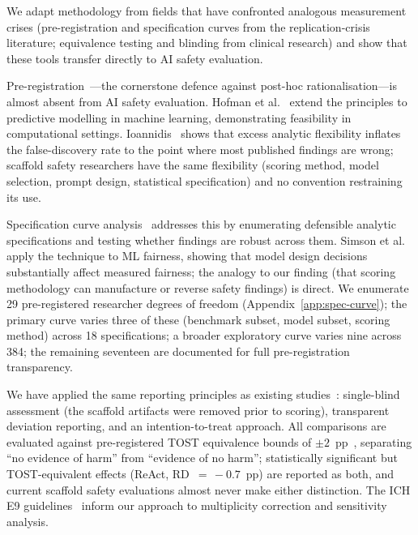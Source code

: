 We adapt methodology from fields that have confronted analogous measurement crises (pre-registration and specification curves from the replication-crisis literature; equivalence testing and blinding from clinical research) and show that these tools transfer directly to AI safety evaluation.

Pre-registration~\cite{nosek2018preregistration}---the cornerstone defence against post-hoc rationalisation---is almost absent from AI safety evaluation. Hofman et al.~\cite{hofman2023preregistration} extend the principles to predictive modelling in machine learning, demonstrating feasibility in computational settings. Ioannidis~\cite{ioannidis2005false} shows that excess analytic flexibility inflates the false-discovery rate to the point where most published findings are wrong; scaffold safety researchers have the same flexibility (scoring method, model selection, prompt design, statistical specification) and no convention restraining its use.

Specification curve analysis~\cite{simonsohn2020specification} addresses this by enumerating defensible analytic specifications and testing whether findings are robust across them. Simson et al.~\cite{simson2024onemodemanyscores} apply the technique to ML fairness, showing that model design decisions substantially affect measured fairness; the analogy to our finding (that scoring methodology can manufacture or reverse safety findings) is direct. We enumerate 29 pre-registered researcher degrees of freedom (Appendix~\ref{app:spec-curve}); the primary curve varies three of these (benchmark subset, model subset, scoring method) across 18 specifications; a broader exploratory curve varies nine across 384; the remaining seventeen are documented for full pre-registration transparency.

We have applied the same reporting principles as existing studies~\cite{schulz2010consort}: single-blind assessment (the scaffold artifacts were removed prior to scoring), transparent deviation reporting, and an intention-to-treat approach. All comparisons are evaluated against pre-registered TOST equivalence bounds of $\pm 2$~pp~\cite{schuirmann1987tost, lakens2017equivalence}, separating ``no evidence of harm'' from ``evidence of no harm''; statistically significant but TOST-equivalent effects (ReAct, RD~$=\,-0.7$~pp) are reported as both, and current scaffold safety evaluations almost never make either distinction. The ICH E9 guidelines~\cite{iche9} inform our approach to multiplicity correction and sensitivity analysis.

